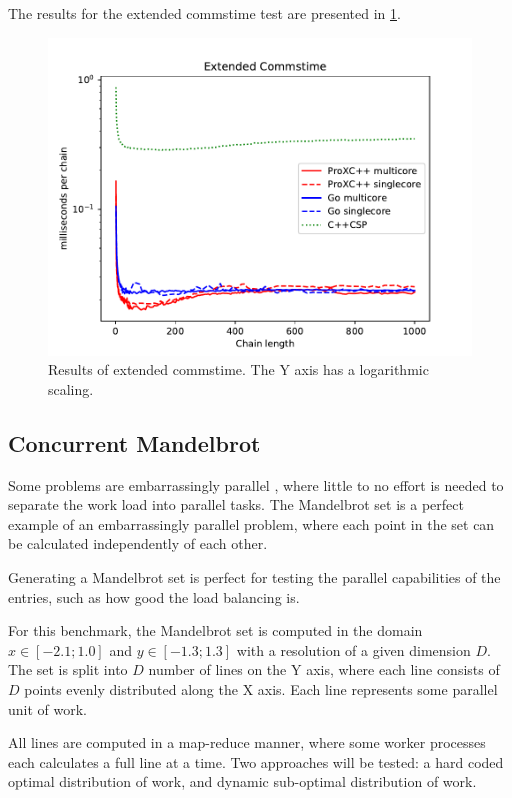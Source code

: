 The results for the extended commstime test are presented in \cref{fig:extended_commstime}.

\begin{figure}[h!]
    \centering
    \includegraphics[width=0.9\linewidth]{fig/extended_commstime}
    \caption{Results of extended commstime. The Y axis has a logarithmic scaling.}
    \label{fig:extended_commstime}
\end{figure}


\FloatBarrier
\subsection{Concurrent Mandelbrot}
\label{subsec:concurrent_mandelbrot_test}


Some problems are embarrassingly parallel \citep{wilkinson1999parallel}, where little to no effort is needed to separate the work load into parallel tasks. The Mandelbrot set is a perfect example of an embarrassingly parallel problem, where each point in the set can be calculated independently of each other.

Generating a Mandelbrot set is perfect for testing the parallel capabilities of the entries, such as how good the load balancing is.

For this benchmark, the Mandelbrot set is computed in the domain $x\in[-2.1;1.0]$ and $y\in[-1.3;1.3]$ with a resolution of a given dimension $D$. The set is split into $D$ number of lines on the Y axis, where each line consists of $D$ points evenly distributed along the X axis. Each line represents some parallel unit of work.

All lines are computed in a map\hyp{}reduce manner, where some worker processes each calculates a full line at a time. Two approaches will be tested: a hard coded optimal distribution of work, and dynamic sub\hyp{}optimal distribution of work.

